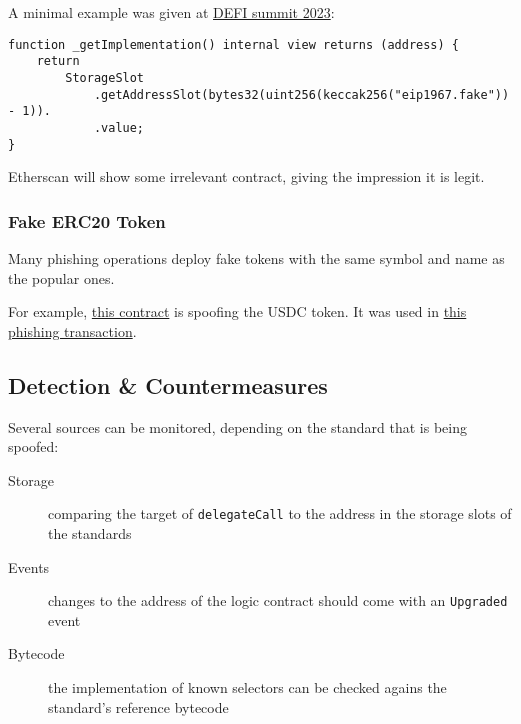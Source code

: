 A minimal example was given at \href{\urlvideomasqueradingcode}{DEFI summit 2023}:

\begin{lstlisting}[language=Solidity]
function _getImplementation() internal view returns (address) {
    return
        StorageSlot
            .getAddressSlot(bytes32(uint256(keccak256("eip1967.fake")) - 1)).
            .value;
}
\end{lstlisting}

Etherscan will show some irrelevant contract, giving the impression it is legit.

\pagebreak
\subsubsection{Fake ERC20 Token}

Many phishing operations deploy fake tokens with the same symbol and name as the popular ones.

For example, \href{https://etherscan.io/address/0x5ed7ca349efc40550eecef4b288158fb2b9f12de}{this contract} is spoofing the USDC token.
It was used in \href{https://explorer.phalcon.xyz/tx/eth/0x7448178a8a03a0f1f298b697507f0e9172eacf1d32d422f48d0345c19c76eba3?line=33}{this phishing transaction}.

\subsection{Detection \& Countermeasures}

Several sources can be monitored, depending on the standard that is being spoofed:

\begin{description}
\item[Storage]{comparing the target of \lstinline[language=Solidity]{delegateCall} to the address in the storage slots of the standards}
\item[Events]{changes to the address of the logic contract should come with an \lstinline[language=Solidity]{Upgraded} event}
\item[Bytecode]{the implementation of known selectors can be checked agains the standard's reference bytecode}
\end{description}
